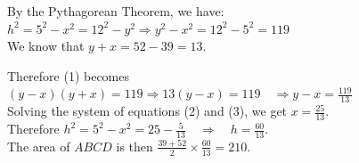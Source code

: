 \documentclass{article}
\begin{document}
By the Pythagorean Theorem, we have:\\
\(h^{2}=5^{2}-x^{2}=12^{2}-y^{2} \Rightarrow y^{2}-x^{2}=12^{2}-5^{2}=119\)\\
We know that \(y+x=52-39=13\).

Therefore (1) becomes\\
\((y-x)(y+x)=119 \Rightarrow 13(y-x)=119 \quad \Rightarrow y-x=\frac{119}{13}\)\\
Solving the system of equations (2) and (3), we get \(x=\frac{25}{13}\).\\
Therefore \(h^{2}=5^{2}-x^{2}=25-\frac{5}{13} \quad \Rightarrow \quad h=\frac{60}{13}\).\\
The area of \(A B C D\) is then \(\frac{39+52}{2} \times \frac{60}{13}=210\).\\
\end{document}
